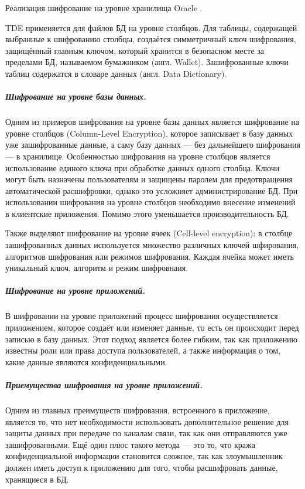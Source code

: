 Реализация шифрование на уровне хранилища Oracle \cite{Oracle-TDE}.

TDE применяется для файлов БД на уровне столбцов. Для таблицы, содержащей выбранные к шифрованию
столбцы, создаётся симметричный ключ шифрования, защищённый главным ключом, который хранится в
безопасном месте за пределами БД, называемом бумажником (англ. Wallet). Зашифрованные ключи таблиц
содержатся в словаре данных (англ. Data Dictionary). \\

\subparagraph{Шифрование на уровне базы данных.}
Одним из примеров шифрования на уровне базы данных является шифрование на уровне столбцов
(Column-Level Encryption), которое записывает в базу данных уже зашифрованные данные, а саму базу
данных — без дальнейшего шифрования — в хранилище. Особенностью шифрования на уровне столбцов
является использование единого ключа при обработке данных одного столбца. Ключи могут быть
назначены пользователям и защищены паролем для предотвращения автоматической расшифровки, однако
это усложняет администрирование БД\cite{IBM-CLE}. При использовании шифрования на уровне столбцов необходимо
внесение изменений в клиентские приложения. Помимо этого уменьшается производительность БД.

Также выделяют шифрование на уровне ячеек (Cell-level encryption):  в столбце зашифрованных данных используется множество различных ключей шфирования, алгоритмов шифрования или режимов шифрования. Каждая ячейка может иметь уникальный ключ, алгоритм и режим шифровнаия.\cite{IBM-CLE}

\subparagraph{Шифрование на уровне приложений.}
В шифровании на уровне приложений процесс шифрования осуществляется приложением, которое создаёт
или изменяет данные, то есть он происходит перед записью в базу данных. Этот подход является более
гибким, так как приложению известны роли или права доступа пользователей, а также информация о том,
какие данные являются конфиденциальными.

\subparagraph{Приемущества шифрования на уровне приложений.}

Одним из главных преимуществ шифрования, встроенного в приложение, является то, что нет
необходимости использовать дополнительное решение для защиты данных при передаче по каналам связи,
так как они отправляются уже зашифрованными. Ещё один плюс такого метода — это то, что кража
конфиденциальной информации становится сложнее, так как злоумышленник должен иметь доступ к
приложению для того, чтобы расшифровать данные, хранящиеся в БД.

